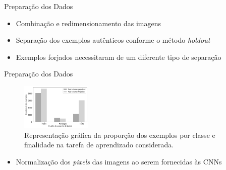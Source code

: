 \begin{frame}{Preparação dos Dados}
  \baselineskip
  \begin{itemize}
    \item Combinação e redimensionamento das imagens
    \bigskip
    \item Separação dos exemplos autênticos conforme o método \emph{holdout}
    \item Exemplos forjados necessitaram de um diferente tipo de separação
  \end{itemize}

  \begin{table}[h!]
	\centering
	\caption{Quantitativo de exemplos.}
	\label{tab:divisao-dados}
  \end{table}
\end{frame}


\begin{frame}{Preparação dos Dados}
  \begin{figure}[h!]
  \centering
  \caption{Representação gráfica da proporção dos exemplos por classe e finalidade na tarefa de aprendizado considerada.}
  \label{fig:divisao-dados}
  \includegraphics[width=0.3\textwidth]{./img/divisao-dados}
  \end{figure}

  \begin{itemize}
    \item Normalização dos \emph{pixels} das imagens ao serem fornecidas às CNNs
  \end{itemize}
\end{frame}

